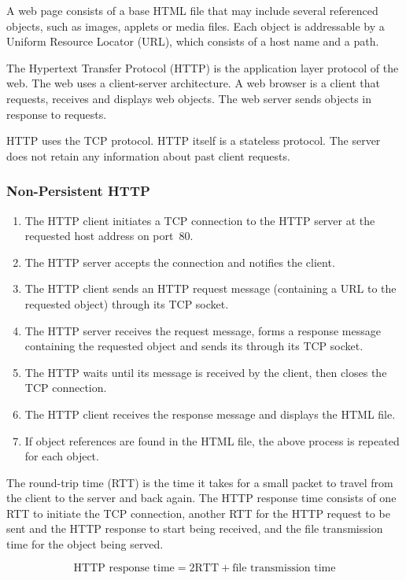 A web page consists of a base HTML file that may include several referenced objects, such as images, applets or media files.
Each object is addressable by a Uniform Resource Locator (URL), which consists of a host name and a path.

The Hypertext Transfer Protocol (HTTP) is the application layer protocol of the web.
The web uses a client-server architecture.
A web browser is a client that requests, receives and displays web objects.
The web server sends objects in response to requests.

HTTP uses the TCP protocol.
HTTP itself is a stateless protocol.
The server does not retain any information about past client requests.

\subsubsection{Non-Persistent HTTP}

\begin{enumerate}
  \item The HTTP client initiates a TCP connection to the HTTP server at the requested host address on port~\num{80}.
  \item The HTTP server accepts the connection and notifies the client.
  \item The HTTP client sends an HTTP request message (containing a URL to the requested object) through its TCP socket.
  \item The HTTP server receives the request message, forms a response message containing the requested object and sends its through its TCP socket.
  \item The HTTP waits until its message is received by the client, then closes the TCP connection.
  \item The HTTP client receives the response message and displays the HTML file.
  \item If object references are found in the HTML file, the above process is repeated for each object.
\end{enumerate}

The round-trip time (RTT) is the time it takes for a small packet to travel from the client to the server and back again.
The HTTP response time consists of one RTT to initiate the TCP connection, another RTT for the HTTP request to be sent and the HTTP response to start being received, and the file transmission time for the object being served.

\begin{equation*}
  \text{HTTP response time} = 2 \text{RTT} + \text{file transmission time}
\end{equation*}

